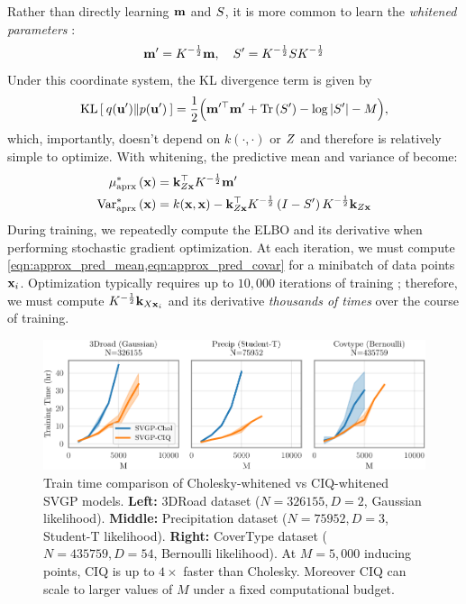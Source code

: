 Rather than directly learning $\mathbf{m}$ and $S$, it is more common to learn the \emph{whitened parameters} \cite{kuss2005assessing,matthews2017scalable}:
\[ \mathbf{m}' = K^{-\frac 1 2} \mathbf{m}, \quad S' = K^{-\frac 1 2} S K^{-\frac 1 2} \]
Under this coordinate system, the KL divergence term is given by
%
\begin{equation}
	\kl{ q(\bu') }{ p(\bu') } = \frac{1}{2} \Bigl( \bm^{\prime \top} \bm' + \tr{ \bS' } - \log \vert \bS' \vert - M \Bigr),
	\label{eqn:kldiv_whitened}
\end{equation}
%
which, importantly, doesn't depend on $k(\cdot,\cdot)$ or $Z$ and therefore is relatively simple to optimize.
With whitening, the predictive mean and variance of become:
%
\begin{align}
  \mu^*_\text{aprx} \left( \mathbf{x} \right) &= \mathbf{k}_{Z\mathbf{x}}^\top K^{-\frac 1 2} \mathbf{m}'
  \label{eqn:approx_pred_mean} \\
  \text{Var}^*_\text{aprx} \left( \mathbf{x} \right) &= k(\mathbf{x}, \mathbf{x}) -
    \mathbf{k}_{Z\mathbf{x}}^\top K^{-\frac 1 2} \left( I - S' \right) K^{-\frac 1 2} \mathbf{k}_{Z\mathbf{x}}
  \label{eqn:approx_pred_covar}
\end{align}
%
During training, we repeatedly compute the ELBO and its derivative when performing stochastic gradient optimization.
At each iteration, we must compute \cref{eqn:approx_pred_mean,eqn:approx_pred_covar} for a minibatch of data points $\mathbf{x}_i$.
Optimization typically requires up to $10,\!000$ iterations of training \citep[e.g.][]{salimbeni2018natural};
therefore, we must compute $K^{- \frac 1 2} \mathbf{k}_{X \mathbf{x}_i}$ and its derivative \emph{thousands of times} over the course of training.

\begin{figure}[t!]
  \centering
  \includegraphics[width=\linewidth]{figures/variational_time.pdf}
  \caption[Train time comparison of Cholesky-whitened vs CIQ-whitened SVGP models.]{
    Train time comparison of Cholesky-whitened vs CIQ-whitened SVGP models.
    {\bf Left:} 3DRoad dataset ($N=326155, D=2$, Gaussian likelihood).
    {\bf Middle:} Precipitation dataset ($N=75952, D=3$, Student-T likelihood).
    {\bf Right:} CoverType dataset ($N=435759, D=54$, Bernoulli likelihood).
    At $M=5,\!000$ inducing points, CIQ is up to $4\times$ faster than Cholesky.
    Moreover CIQ can scale to larger values of $M$ under a fixed computational budget.
  }
  \label{fig:variational_timing}
\end{figure}

